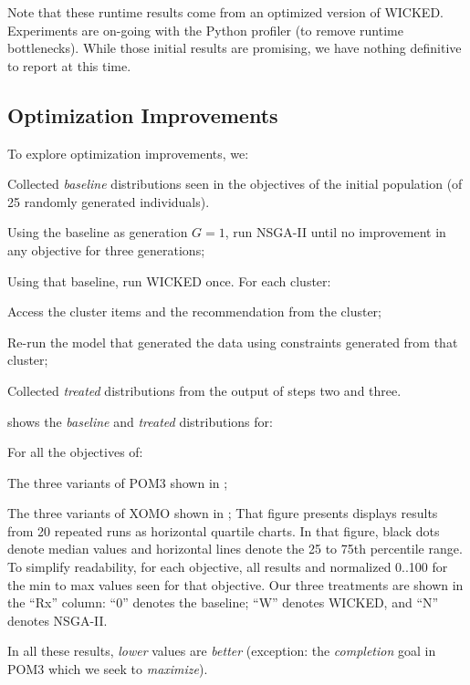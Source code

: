 Note that these runtime results come from an optimized version of WICKED.
Experiments are on-going with the Python profiler 
(to remove runtime bottlenecks). While those initial results are promising, we have
nothing definitive to report at this time.

\subsection{Optimization Improvements}

To explore optimization improvements, we:
\be
\item
Collected
{\em baseline}  distributions seen in the objectives of the initial population
(of 25 randomly generated individuals). 
\item Using the baseline as generation $G=1$, run NSGA-II until
no improvement in any objective for three generations;
\item Using that baseline, run WICKED once. For each cluster:
\bi
\item
Access the cluster items and the recommendation from the cluster;
\item
Re-run the model that generated the data using constraints
generated from that cluster; 
 \ei
\item Collected {\em treated} distributions from the output
of steps two and three.
\ee

 shows the {\em baseline} and {\em treated} distributions
for:
\bi
\item For all the objectives of:
\bi
\item The three variants of POM3 shown in ;
\item The three variants of XOMO shown in ;
\ei
\ei
That figure presents displays results from 20
repeated runs as horizontal quartile charts. In that
figure, black dots denote median values and
horizontal lines denote the 25 to 75th percentile
range.  To simplify readability, for each objective,
all results and normalized 0..100 for the min to max
values seen for that objective.  Our three
treatments are shown in the ``Rx'' column: ``0''
denotes the baseline; ``W'' denotes WICKED, and
``N'' denotes NSGA-II.

In all these results, {\em lower} values are {\em
better} (exception: the {\em completion} goal in
POM3 which we seek to {\em maximize}). 

